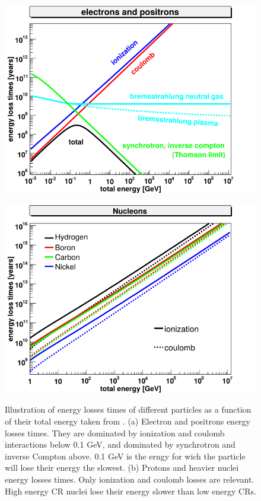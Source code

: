 \begin{figure}[h]
  \centering
  \begin{minipage}[h]{0.45\textwidth}
  	\centering
	\includegraphics[width=1.\linewidth]{pic/theory/energy_losses_electrons-1.png}
  	\subcaption{}
  	\label{fig:E_losses_a}
  \end{minipage}
  \hfill
  \begin{minipage}[h]{0.45\textwidth}
	  \centering
	  \includegraphics[width=1.\linewidth]{pic/theory/energy_losses_nucleons.png}
	  \subcaption{}
	  \label{fig:E_losses_b}
  \end{minipage}
  \caption[Energy losses over time of CR particles.]{Illustration of energy losses times of different particles as a function of their total energy taken from \cite{Gebauer2010}. (a) Electron and positrons energy losses times. They are dominated by ionization and coulomb interactions below 0.1 GeV, and dominated by synchrotron and inverse Compton above. 0.1 GeV is the erngy for wich the particle will lose their energy the slowest. (b) Protons and heavier nuclei energy losses times. Only ionization and coulomb losses are relevant. High energy CR nuclei lose their energy slower than low energy CRs.}
  \label{fig:E_losses} 
\end{figure}



